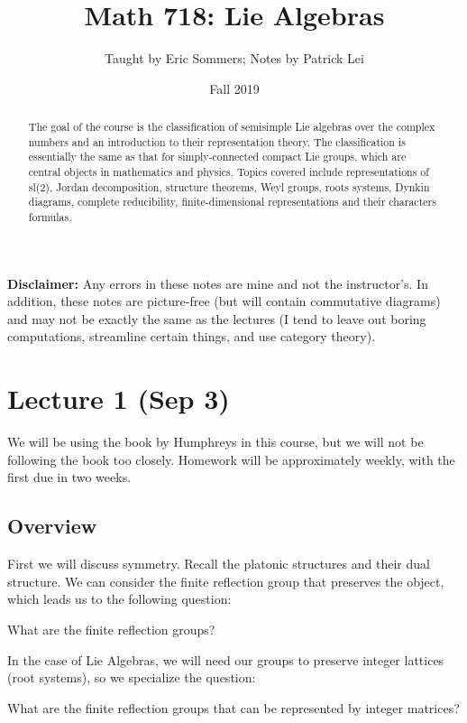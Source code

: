 \documentclass[twoside, 10pt]{article}
\title{Math 718: Lie Algebras}
\author{Taught by Eric Sommers; Notes by Patrick Lei}
\affil{University of Massachusetts, Amherst}
\date{Fall 2019}
\begin{document}
    \maketitle\thispagestyle{firstpage}
    
    \begin{abstract}
        The goal of the course is the classification of semisimple Lie algebras
    over the complex numbers and an introduction to their representation
theory. The classification is essentially the same as that for simply-connected
compact Lie groups, which are central objects in mathematics and physics.
Topics covered include representations of sl(2), Jordan decomposition,
structure theorems, Weyl groups, roots systems, Dynkin diagrams, complete
reducibility, finite-dimensional representations and their characters formulas.
\end{abstract}

    \tableofcontents

    \textbf{Disclaimer:} Any errors in these notes are mine and not the
    instructor's. In addition, these notes are picture-free (but will contain
    commutative diagrams) and may not be exactly the same as the lectures (I
    tend to leave out boring computations, streamline certain things, and use
    category theory).

    \section{Lecture 1 (Sep 3)}%


    We will be using the book by Humphreys in this course, but we will not be
    following the book too closely. Homework will be approximately weekly, with
    the first due in two weeks.

    \subsection{Overview}%
    
    
    First we will discuss symmetry. Recall the platonic structures and their
    dual structure. We can consider the finite reflection group that preserves
    the object, which leads us to the following question:

    \begin{quest} What are the finite reflection groups?  \end{quest} In the
    case of Lie Algebras, we will need our groups to preserve integer lattices
    (root systems), so we specialize the question: \begin{quest} What are the
        finite reflection groups that can be represented by integer matrices?
    \end{quest}
\end{document}
